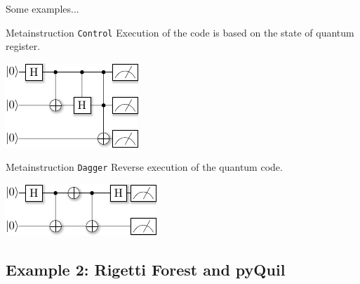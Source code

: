 \documentclass{beamer}
\begin{document}
\begin{frame}{\insertsection}{\insertsubsection}
Some examples...
\end{frame}

\begin{frame}{\insertsection}{\insertsubsection}
    \begin{block}{Metainstruction \texttt{Control}}
        Execution of the code is based on the state of quantum register.
    \end{block}

    \begin{center}
     \includegraphics[scale=1.5]{pics/meta_control_circ.pdf}
    \end{center}
\end{frame}

\begin{frame}{\insertsection}{\insertsubsection}
    \begin{block}{Metainstruction \texttt{Dagger}}
        Reverse execution of the quantum code.
    \end{block}
    
    \begin{center}
        \includegraphics[scale=1.5]{pics/meta_dagger_circ.pdf}
    \end{center}
\end{frame}

\subsection{Example 2: Rigetti Forest and pyQuil}
\end{document}
